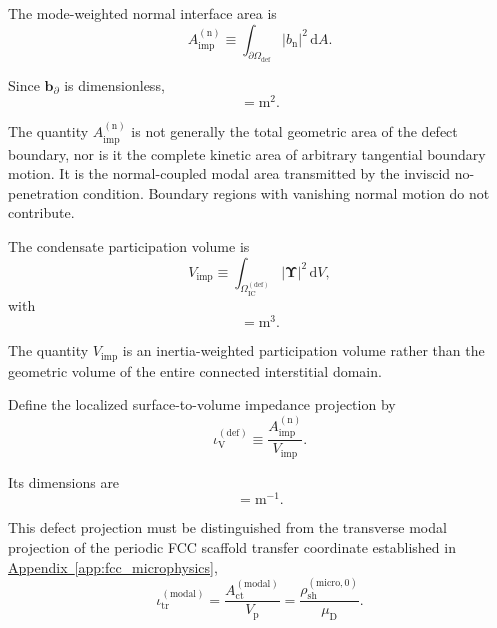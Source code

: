 The mode-weighted normal interface area is
\begin{equation}
    A_{\mathrm{imp}}^{(\mathrm{n})}\equiv\int_{\partial\Omega_{\mathrm{def}}}|b_{\mathrm{n}}|^{2}\,\mathrm{d}A.
\end{equation}

Since $\mathbf{b}_{\partial}$ is dimensionless,
\begin{equation}
    [A_{\mathrm{imp}}^{(\mathrm{n})}]=\mathrm{m}^{2}.
\end{equation}

The quantity $A_{\mathrm{imp}}^{(\mathrm{n})}$ is not generally the total geometric area of the defect boundary, nor is it the complete kinetic area of arbitrary tangential boundary motion. It is the normal-coupled modal area transmitted by the inviscid no-penetration condition. Boundary regions with vanishing normal motion do not contribute.

The condensate participation volume is
\begin{equation}
    V_{\mathrm{imp}}\equiv\int_{\Omega_{\mathrm{IC}}^{(\mathrm{def})}}|\boldsymbol{\Upsilon}|^{2}\,\mathrm{d}V,
\end{equation}
with
\begin{equation}
    [V_{\mathrm{imp}}]=\mathrm{m}^{3}.
\end{equation}

The quantity $V_{\mathrm{imp}}$ is an inertia-weighted participation volume rather than the geometric volume of the entire connected interstitial domain.

Define the localized surface-to-volume impedance projection by
\begin{equation}
    \label{eq:AP_defect_projection}
    \iota_{\mathrm{V}}^{(\mathrm{def})}\equiv\frac{A_{\mathrm{imp}}^{(\mathrm{n})}}{V_{\mathrm{imp}}}.
\end{equation}

Its dimensions are
\begin{equation}
    [\iota_{\mathrm{V}}^{(\mathrm{def})}]=\mathrm{m}^{-1}.
\end{equation}

This defect projection must be distinguished from the transverse modal projection of the periodic FCC scaffold transfer coordinate established in \hyperref[app:fcc_microphysics]{Appendix~\ref*{app:fcc_microphysics}},
\begin{equation}
    \iota_{\mathrm{tr}}^{(\mathrm{modal})}
    =
    \frac{A_{\mathrm{ct}}^{(\mathrm{modal})}}{V_{\mathrm{p}}}
    =
    \frac{\rho_{\mathrm{sh}}^{(\mathrm{micro},0)}}{\mu_{\mathrm{D}}}.
\end{equation}

